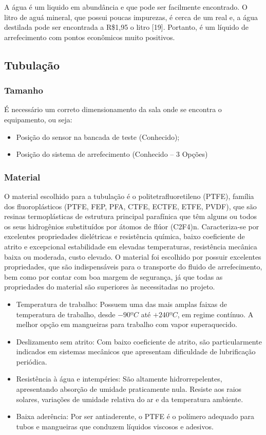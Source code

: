 A água é um liquido em abundância e que pode ser facilmente encontrado. O litro de aguá mineral, que possui poucas impurezas, é cerca de um real e, a água destilada pode ser encontrada a R\$1,95 o litro [19]. Portanto, é um líquido de arrefecimento com pontos econômicos muito positivos.

\subsection{Tubulação}

\subsubsection{Tamanho}
É necessário um correto dimensionamento da sala onde se encontra o equipamento, ou seja:
\begin{itemize}
\item Posição do sensor na bancada de teste (Conhecido);
\item Posição do sistema de arrefecimento (Conhecido – 3 Opções)
\end{itemize}

\subsubsection{Material}
O material escolhido para a tubulação é o politetrafluoretileno (PTFE), família dos fluoroplásticos (PTFE, FEP, PFA, CTFE, ECTFE, ETFE, PVDF), que são resinas termoplásticas de estrutura principal parafínica que têm alguns ou todos os seus hidrogênios substituídos por átomos de flúor (C2F4)n. Caracteriza-se por excelentes propriedades dielétricas e resistência química, baixo coeficiente de atrito e excepcional estabilidade em elevadas temperaturas, resistência mecânica baixa ou moderada, custo elevado. 
O material foi escolhido por possuir excelentes propriedades, que são indispensáveis para o transporte do fluido de arrefecimento, bem como por contar com boa margem de segurança, já que todas as propriedades do material são superiores às necessitadas no projeto.

\begin{itemize}
\item Temperatura de trabalho: Possuem uma das mais amplas faixas de temperatura de trabalho, desde $-90ºC$ até $+240ºC$, em regime contínuo. A melhor opção em mangueiras para trabalho com vapor superaquecido.
\item Deslizamento sem atrito: Com baixo coeficiente de atrito, são particularmente indicados em sistemas mecânicos que apresentam dificuldade de lubrificação periódica.
\item Resistência à água e intempéries: São altamente hidrorrepelentes, apresentando absorção de umidade praticamente nula. Resiste aos raios solares, variações de umidade relativa do ar e da temperatura ambiente. 
\item Baixa aderência: Por ser antiaderente, o PTFE é o polímero adequado para tubos e mangueiras que conduzem líquidos viscosos e adesivos. 
\end{itemize}

